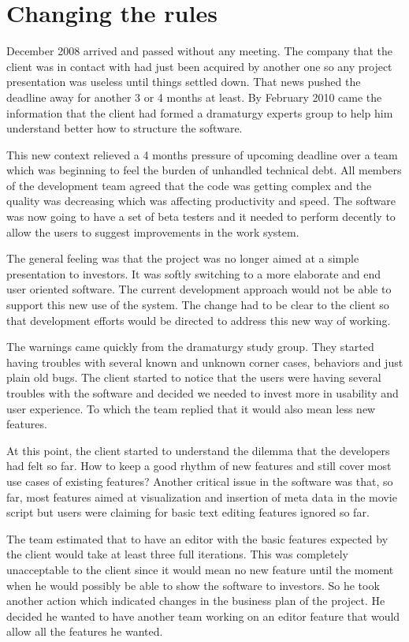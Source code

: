 \documentclass[lnbip]{svmultln}
\begin{document}
\section{Changing the rules}
\label{sec:changes}

December 2008 arrived and passed without any meeting. The company that
the client was in contact with had just been acquired by another one
so any project presentation was useless until things settled
down. That news pushed the deadline away for another 3 or 4 months at
least. By February 2010 came the information that the client had
formed a dramaturgy experts group to help him understand better how to
structure the software.

This new context relieved a 4 months pressure of upcoming deadline
over a team which was beginning to feel the burden of unhandled
technical debt. All members of the development team agreed that the
code was getting complex and the quality was decreasing which was
affecting productivity and speed. The software was now going to have a
set of beta testers and it needed to perform decently to allow the
users to suggest improvements in the work system.

The general feeling was that the project was no longer aimed at a
simple presentation to investors. It was softly switching to a more
elaborate and end user oriented software. The current development
approach would not be able to support this new use of the system. The
change had to be clear to the client so that development efforts would
be directed to address this new way of working.

The warnings came quickly from the dramaturgy study group. They
started having troubles with several known and unknown corner cases,
behaviors and just plain old bugs. The client started to notice that
the users were having several troubles with the software and decided
we needed to invest more in usability and user experience. To which
the team replied that it would also mean less new features.

At this point, the client started to understand the dilemma that the
developers had felt so far. How to keep a good rhythm of new features
and still cover most use cases of existing features? Another critical
issue in the software was that, so far, most features aimed at
visualization and insertion of meta data in the movie script but users
were claiming for basic text editing features ignored so far.

The team estimated that to have an editor with the basic features
expected by the client would take at least three full iterations. This
was completely unacceptable to the client since it would mean no new
feature until the moment when he would possibly be able to show the
software to investors. So he took another action which indicated
changes in the business plan of the project. He decided he wanted to
have another team working on an editor feature that would allow all
the features he wanted.
\end{document}
